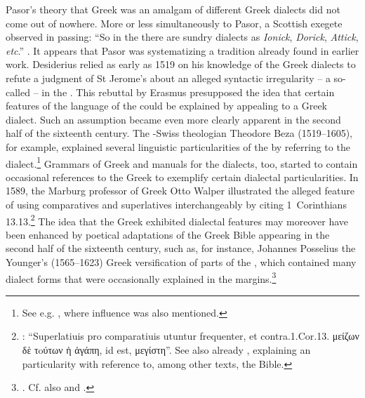 Pasor’s theory that  Greek was an amalgam of different Greek dialects did not come out of nowhere. More or less simultaneously to Pasor, a Scottish exegete observed in passing: “So in the  there are sundry dialects as \textit{Ionick}, \textit{Dorick}, \textit{Attick}, \textit{etc}.” \citep[102]{Weemes1632}. It appears that Pasor was systematizing a tradition already found in earlier work. Desiderius \citet[270]{Erasmus1519} relied as early as 1519 on his knowledge of the Greek dialects to refute a judgment of St Jerome’s about an alleged syntactic irregularity – a so-called  – in the . This rebuttal by Erasmus presupposed the idea that certain features of the language of the  could be explained by appealing to a Greek dialect. Such an assumption became even more clearly apparent in the second half of the sixteenth century. The -Swiss  theologian Theodore Beza (1519–1605), for example, explained several linguistic particularities of the  by referring to the  dialect.\footnote{See e.g. \citet[\textsc{i.}226, \textsc{ii}.355]{Beza1594}, where  influence was also mentioned.} Grammars of Greek and manuals for the dialects, too, started to contain occasional references to the Greek  to exemplify certain dialectal particularities. In 1589, the Marburg professor of Greek Otto Walper illustrated the alleged  feature of using comparatives and superlatives interchangeably by citing 1~Corinthians 13.13.\footnote{\citet[32]{Walper1589}: “Superlatiuis pro comparatiuis utuntur frequenter, et contra.1.Cor.13. μείζων δὲ τoύτων ἡ ἀγάπη, id est, μεγίστη”. See also already \citet[251]{Ruland1556}, explaining an  particularity with reference to, among other texts, the Bible.} The idea that the Greek  exhibited dialectal features may moreover have been enhanced by poetical adaptations of the Greek Bible appearing in the second half of the sixteenth century, such as, for instance, Johannes Posselius the Younger’s (1565–1623) Greek versification of parts of the , which contained many dialect forms that were occasionally explained in the margins.\footnote{\citet{Posselius1599}. Cf. also \citet{Jamot1593} and \citet{Keimann1649}.}


